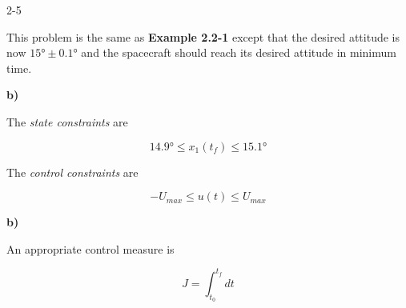 \begin{problem}{2-5}
\end{problem}

This problem is the same as \textbf{Example 2.2-1} except that the desired 
attitude is now $\ang{15} \pm \ang{0.1}$ and the spacecraft should reach its 
desired attitude in minimum time.

\noindent \textbf{b)}

The \textit{state constraints} are

\begin{equation}\label{eq:sc_att_15}
    \ang{14.9} \leq x_1(t_f) \leq \ang{15.1}
\end{equation}

The \textit{control constraints} are

\begin{equation}\label{eq:sc_att_15}
   -U_{max} \leq u(t) \leq U_{max}
\end{equation}

\noindent \textbf{b)}

An appropriate control measure is

\begin{equation}
  J = \int_{t_0}^{t_f} dt
\end{equation}



